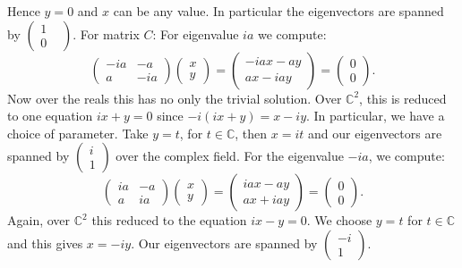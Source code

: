 \documentclass[
  a4paper,
  oneside,
  final]{krantz}
\newcommand{\C}{\mathbb{C}}
\theoremstyle{definition}
\theoremstyle{definition}
\theoremstyle{definition}
\theoremstyle{definition}
\theoremstyle{remark}
\begin{document}
Hence \(y = 0\) and \(x\) can be any value. In particular the eigenvectors are spanned by \(\begin{pmatrix} 1& \\0 \end{pmatrix}\).
For matrix \(C\):
For eigenvalue \(ia\) we compute:
\[\begin{pmatrix}-ia & -a \\ a & -ia \end{pmatrix} \begin{pmatrix} x \\ y \end{pmatrix} =  \begin{pmatrix} -ia x -ay \\ ax -iay \end{pmatrix}  = \begin{pmatrix} 0 \\ 0 \end{pmatrix}.\]
Now over the reals this has no only the trivial solution. Over \(\C^{2}\), this is reduced to one equation \(ix +y = 0\) since \(-i(ix +y) = x -iy\). In particular, we have a choice of parameter. Take \(y = t\), for \(t \in \C\), then \(x = it\) and our eigenvectors are spanned by \(\begin{pmatrix} i \\ 1 \end{pmatrix}\) over the complex field.
For the eigenvalue \(-ia\), we compute:
\[\begin{pmatrix}ia & -a \\ a & ia \end{pmatrix} \begin{pmatrix} x \\ y \end{pmatrix} =  \begin{pmatrix} ia x -ay \\ ax +iay \end{pmatrix}  = \begin{pmatrix} 0 \\ 0 \end{pmatrix}.\]
Again, over \(\C^2\) this reduced to the equation \(ix -y = 0\). We choose \(y = t\) for \(t \in \C\) and this gives \(x = -iy\). Our eigenvectors are spanned by \(\begin{pmatrix} -i \\ 1 \end{pmatrix}\).

\vspace{\baselineskip}
\end{document}
